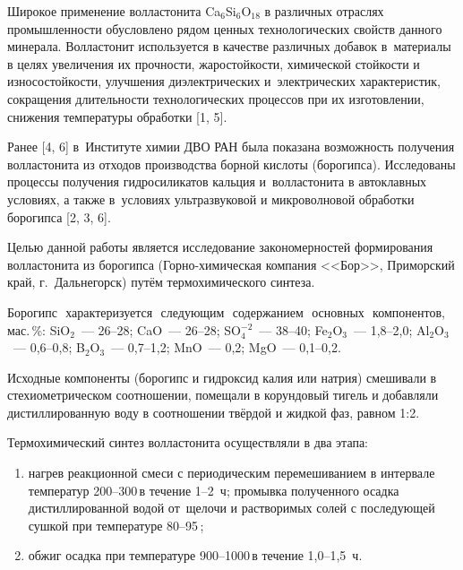 


\makeProcTitleIINewLine


Широкое применение волластонита Ca$_6$Si$_6$O$_{18}$ в различных отраслях промышленности обусловлено рядом ценных технологических свойств данного минерала. Волластонит используется в качестве различных добавок в~материалы в целях увеличения их прочности, жаростойкости, химической стойкости и износостойкости, улучшения диэлектрических и~электрических характеристик, сокращения длительности технологических процессов при их изготовлении, снижения температуры обработки [1, 5].

Ранее [4, 6] в~Институте химии ДВО РАН была показана возможность получения волластонита из отходов производства борной кислоты (борогипса). Исследованы процессы получения гидросиликатов кальция и~волластонита в автоклавных условиях, а также в~условиях ультразвуковой и микроволновой обработки борогипса [2, 3, 6].



Целью данной работы является исследование закономерностей формирования волластонита из борогипса (Горно-химическая компания <<Бор>>, Приморский край, г.~Дальнегорск) путём термохимического синтеза.

Борогипс\,\, характеризуется\,\, следующим\,\, содержанием\,\, основных\,\, компонентов,\,\, мас.\,\%: SiO$_2$~--- 26--28; CaO~--- 26--28; SO$_4^{-2}$~--- 38--40; Fe$_2$O$_3$~--- 1,8--2,0; Al$_2$O$_3$~--- 0,6--0,8; B$_2$O$_3$~--- 0,7--1,2; MnO~--- 0,2; MgO~--- 0,1--0,2.

Исходные компоненты (борогипс и гидроксид калия или натрия) смешивали в стехиометрическом соотношении, помещали в корундовый тигель и добавляли дистиллированную воду в соотношении твёрдой и жидкой фаз, равном 1:2.\enlargethispage{\baselineskip}

Термохимический синтез волластонита осуществляли в два этапа:
\begin{enumerate}[noitemsep]\vspace{-8pt}
  \item нагрев реакционной смеси с периодическим перемешиванием в интервале температур 200--300\,\dgc в течение 1--2~ч; промывка полученного осадка дистиллированной водой от~щелочи и растворимых солей с последующей сушкой при температуре 80--95\,\dgc;
    \item обжиг осадка при температуре 900--1000\,\dgc в течение 1,0--1,5~ч.
\end{enumerate}
 \vspace{-8pt}

